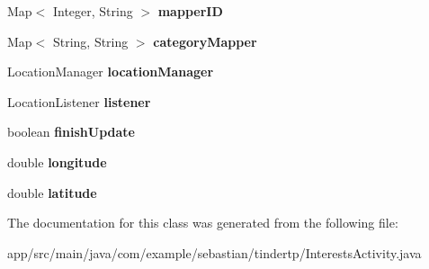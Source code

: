 \begin{DoxyCompactItemize}
\item 
Map$<$ Integer, String $>$ {\bfseries mapper\+ID}\hypertarget{classcom_1_1example_1_1sebastian_1_1tindertp_1_1InterestsActivity_ab09e12a59b5fbc15519fae2585ba695d}{}\label{classcom_1_1example_1_1sebastian_1_1tindertp_1_1InterestsActivity_ab09e12a59b5fbc15519fae2585ba695d}

\item 
Map$<$ String, String $>$ {\bfseries category\+Mapper}\hypertarget{classcom_1_1example_1_1sebastian_1_1tindertp_1_1InterestsActivity_a2fbfbf64a57531753fbe32454f94caa0}{}\label{classcom_1_1example_1_1sebastian_1_1tindertp_1_1InterestsActivity_a2fbfbf64a57531753fbe32454f94caa0}

\item 
Location\+Manager {\bfseries location\+Manager}\hypertarget{classcom_1_1example_1_1sebastian_1_1tindertp_1_1InterestsActivity_a55723791b1c0ff5cefdbed79b9f89af4}{}\label{classcom_1_1example_1_1sebastian_1_1tindertp_1_1InterestsActivity_a55723791b1c0ff5cefdbed79b9f89af4}

\item 
Location\+Listener {\bfseries listener}\hypertarget{classcom_1_1example_1_1sebastian_1_1tindertp_1_1InterestsActivity_af3186c82415a1803935baffa8c89786c}{}\label{classcom_1_1example_1_1sebastian_1_1tindertp_1_1InterestsActivity_af3186c82415a1803935baffa8c89786c}

\item 
boolean {\bfseries finish\+Update}\hypertarget{classcom_1_1example_1_1sebastian_1_1tindertp_1_1InterestsActivity_ac79dfacc55553027c9d1422082512cab}{}\label{classcom_1_1example_1_1sebastian_1_1tindertp_1_1InterestsActivity_ac79dfacc55553027c9d1422082512cab}

\item 
double {\bfseries longitude}\hypertarget{classcom_1_1example_1_1sebastian_1_1tindertp_1_1InterestsActivity_a79a35c7872b9b474e14022978fb105f3}{}\label{classcom_1_1example_1_1sebastian_1_1tindertp_1_1InterestsActivity_a79a35c7872b9b474e14022978fb105f3}

\item 
double {\bfseries latitude}\hypertarget{classcom_1_1example_1_1sebastian_1_1tindertp_1_1InterestsActivity_af743f5618fd4c4a73212d74cff3f5dff}{}\label{classcom_1_1example_1_1sebastian_1_1tindertp_1_1InterestsActivity_af743f5618fd4c4a73212d74cff3f5dff}

\end{DoxyCompactItemize}


The documentation for this class was generated from the following file\+:\begin{DoxyCompactItemize}
\item 
app/src/main/java/com/example/sebastian/tindertp/Interests\+Activity.\+java\end{DoxyCompactItemize}
